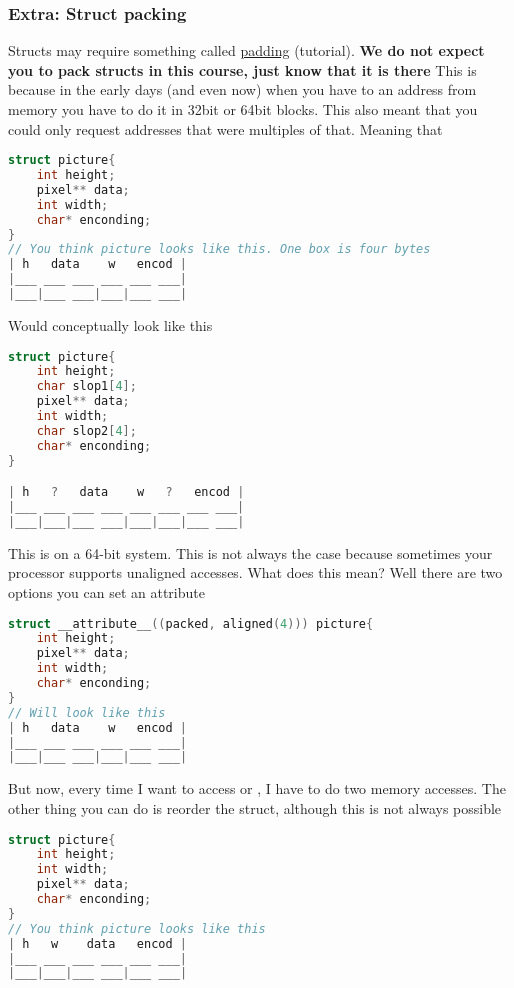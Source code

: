\subsubsection{Extra: Struct packing}

Structs may require something called \href{http://www.catb.org/esr/structure-packing/}{padding} (tutorial). \textbf{We do not expect you to pack structs in this course, just know that it is there} This is because in the early days (and even now) when you have to an address from memory you have to do it in 32bit or 64bit blocks. This also meant that you could only request addresses that were multiples of that. Meaning that

\begin{lstlisting}[language=C]
struct picture{
    int height;
    pixel** data;
    int width;
    char* enconding;
}
// You think picture looks like this. One box is four bytes
| h   data    w   encod |
|___ ___ ___ ___ ___ ___|
|___|___ ___|___|___ ___|
\end{lstlisting}

Would conceptually look like this

\begin{lstlisting}[language=C]
struct picture{
    int height;
    char slop1[4];
    pixel** data;
    int width;
    char slop2[4];
    char* enconding;
}

| h   ?   data    w   ?   encod |
|___ ___ ___ ___ ___ ___ ___ ___|
|___|___|___ ___|___|___|___ ___|
\end{lstlisting}

This is on a 64-bit system. This is not always the case because
sometimes your processor supports unaligned accesses. What does this
mean? Well there are two options you can set an attribute

\begin{lstlisting}[language=C]
struct __attribute__((packed, aligned(4))) picture{
    int height;
    pixel** data;
    int width;
    char* enconding;
}
// Will look like this
| h   data    w   encod |
|___ ___ ___ ___ ___ ___|
|___|___ ___|___|___ ___|

\end{lstlisting}

But now, every time I want to access  or ,
I have to do two memory accesses. The other thing you can do is reorder
the struct, although this is not always possible

\begin{lstlisting}[language=C]
struct picture{
    int height;
    int width;
    pixel** data;
    char* enconding;
}
// You think picture looks like this
| h   w    data   encod |
|___ ___ ___ ___ ___ ___|
|___|___|___ ___|___ ___|

\end{lstlisting}

